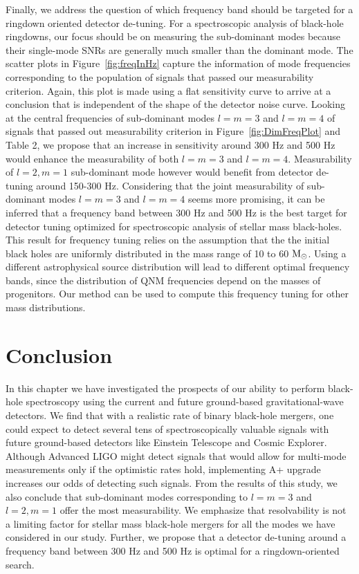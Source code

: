 Finally, we address the question of which frequency band should be targeted for a ringdown oriented detector de-tuning. For a spectroscopic analysis of black-hole ringdowns, our focus should be on measuring the sub-dominant modes because their single-mode SNRs are generally much smaller than the dominant mode. The scatter plots in Figure~\ref{fig:freqInHz} capture the information of mode frequencies corresponding to the population of signals that passed our measurability criterion. Again, this plot is made using a flat sensitivity curve to arrive at a conclusion that is independent of the shape of the detector noise curve. Looking at the central frequencies of sub-dominant modes $l=m=3$ and $l=m=4$ of signals that passed out measurability criterion in Figure~\ref{fig:DimFreqPlot} and Table 2, we propose that an increase in sensitivity around 300 Hz and 500 Hz would enhance the measurability of both $l=m=3$ and $l=m=4$. Measurability of $l=2, m=1$ sub-dominant mode however would benefit from detector de-tuning around 150-300 Hz. Considering that the joint measurability of sub-dominant modes $l=m=3$ and $l=m=4$ seems more promising, it can be inferred that a frequency band between 300 Hz and 500 Hz is the best target for detector tuning optimized for spectroscopic analysis of stellar mass black-holes. This result for frequency tuning relies on the assumption that the the initial black holes are uniformly distributed in the mass range of 10 to 60 $\mathrm{M}_\odot$. Using a different astrophysical source distribution will lead to different optimal frequency bands, since the distribution of QNM frequencies depend on the masses of progenitors. Our method can be used to compute this frequency tuning for other mass distributions.

\section{Conclusion}
\label{sec:conc}

 In this chapter we have investigated the prospects of our ability to perform black-hole spectroscopy using the current and future ground-based gravitational-wave detectors. We find that with a realistic rate of binary black-hole mergers, one could expect to detect several tens of spectroscopically valuable signals with future ground-based detectors like Einstein Telescope and Cosmic Explorer. Although Advanced LIGO might detect signals that would allow for multi-mode measurements only if the optimistic rates hold, implementing A+ upgrade increases our odds of detecting such signals. From the results of this study, we also conclude that sub-dominant modes corresponding to $l=m=3$ and $l=2, m=1$ offer the most measurability. We emphasize that resolvability is not a limiting factor for stellar mass black-hole mergers for all the modes we have considered in our study. Further, we propose that a detector de-tuning around a frequency band between 300 Hz and 500 Hz is optimal for a ringdown-oriented search. 

